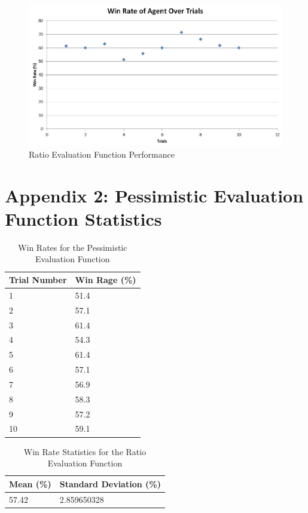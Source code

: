 \documentclass[12pt]{article}
\begin{document}
\begin{figure}[h]
\centering
\caption{Ratio Evaluation Function Performance}
\includegraphics[scale=0.7]{ratio-evaluation-function-results.JPG}
\end{figure}

\clearpage
\section{Appendix 2: Pessimistic Evaluation Function Statistics}
\begin{table}[h]
\centering
\caption{Win Rates for the Pessimistic Evaluation Function}
\label{pessimistic-label}
\begin{tabular}{@{}|l|l|@{}}
\toprule
Trial Number & Win Rage (\%) \\ \midrule
1            & 51.4          \\ \midrule
2            & 57.1          \\ \midrule
3            & 61.4          \\ \midrule
4            & 54.3          \\ \midrule
5            & 61.4          \\ \midrule
6            & 57.1          \\ \midrule
7            & 56.9          \\ \midrule
8            & 58.3          \\ \midrule
9            & 57.2          \\ \midrule
10           & 59.1          \\ \bottomrule
\end{tabular}
\end{table}

\begin{table}[h]
\centering
\caption{Win Rate Statistics for the Ratio Evaluation Function}
\label{ratio-stats}
\begin{tabular}{@{}|l|l|@{}}
\toprule
Mean (\%)& Standard Deviation (\%) \\ \midrule
57.42           & 2.859650328
\\ \bottomrule
\end{tabular}
\end{table}
\end{document}
